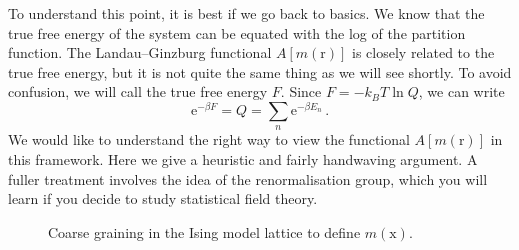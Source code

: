 \documentclass{article}
\theoremstyle{plain}\theoremheaderfont{\normalfont\bfseries}\theorembodyfont{\rmfamily}\theoremseparator{.}\newtheorem*{thm}{Theorem}\newtheorem*{law}{Law}\newtheorem*{pos}{Postulate}
\numberwithin{equation}{section}
\newcommand{\ee}{\mathrm{e}}
\newcommand{\vb}[1]{\bm{\mathrm{#1}}}
\begin{document}
    To understand this point, it is best if we go back to basics. We know that the true free energy of the system can be equated with the log of the partition function. The Landau--Ginzburg functional \(A[m(\vb{r})]\) is closely related to the true free energy, but it is not quite the same thing as we will see shortly. To avoid confusion, we will call the true free energy \(F\). Since \(F=-k_B T\ln Q\), we can write
    \begin{equation}
        \ee^{-\beta F}=Q=\sum_n \ee^{-\beta E_n}\,.
    \end{equation}
    We would like to understand the right way to view the functional \(A[m(\vb{r})]\) in this framework. Here we give a heuristic and fairly handwaving argument. A fuller treatment involves the idea of the renormalisation group, which you will learn if you decide to study statistical field theory.

    \begin{figure}
        \centering
        \caption{Coarse graining in the Ising model lattice to define \(m(\vb{x})\).}
    \end{figure}
\end{document}
